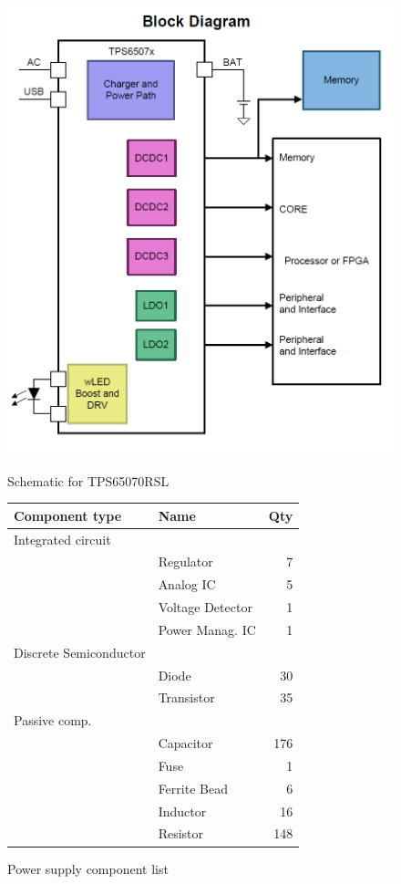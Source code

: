 \documentclass[11pt,a4paper,titlepage]{article}
\begin{document}
        \begin{figure}
          \begin{minipage}{.5\textwidth}
          \centering
          \includegraphics[width = .9\textwidth]{power_managIC.png}
          \caption{Schematic for TPS65070RSL}
          \label{fig:TPS65070RSL}
          \end{minipage}
          \hspace{5mm}
          \begin{minipage}{.5\textwidth}
          \centering
          \begin{tabular}{llr}
          \toprule
          \textbf{Component type} & \textbf{Name} & \textbf{Qty}\\
          \midrule
          Integrated circuit & & \\
           & Regulator & 7\\
           & Analog IC & 5\\
           & Voltage Detector & 1\\
           & Power Manag. IC & 1\\
          \hline
          Discrete Semiconductor & &\\
           & Diode & 30\\
           & Transistor & 35\\
          \hline
          Passive comp. & &\\
           & Capacitor & 176\\
           & Fuse & 1\\
           & Ferrite Bead & 6\\
           & Inductor & 16\\
           & Resistor & 148\\
          \bottomrule
          \end{tabular}
          \caption{Power supply component list}
          \label{tab:power}
          \end{minipage}
        \end{figure}
\end{document}
